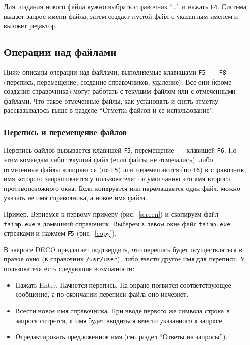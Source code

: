 Для создания нового файла нужно выбрать справочник ``{\tt .}''
и нажать {\tt F4}. Система выдаст запрос имени файла, затем создаст
пустой файл с указанным именем и вызовет редактор.

\subsection{Операции над файлами}

Ниже описаны операции над файлами, выполняемые клавишами {\tt F5}~---~{\tt F8}
(перепись, перемещение, создание справочников, удаление).
Все они (кроме создания справочника) могут работать с текущим
файлом или с отмеченными файлами. Что такое отмеченные
файлы, как установить и снять отметку рассказывалось выше в
разделе ``Отметка файлов и ее использование''.

\subsubsection{Перепись и перемещение файлов}

Перепись файлов вызывается клавишей {\tt F5}, перемещение~--- клавишей {\tt F6}.
По этим командам либо текущий файл (если файлы не отмечались),
либо отмеченные файлы копируются (по {\tt F5}) или перемещаются
(по {\tt F6}) в справочник, имя которого запрашивается у пользователя;
по умолчанию это имя второго, противоположного окна. Если копируется или
перемещается один файл, можно указать не имя справочника, а новое имя файла.

Пример. Вернемся к первому примеру (рис.~\ref{screen}) и скопируем
файл {\tt tsimp.exe} в домашний справочник. Выберем в левом окне файл
{\tt tsimp.exe} стрелками и нажмем {\tt F5} (рис.~\ref{copy}).


В запросе DECO предлагает подтвердить, что перепись
будет осуществляться в правое окно (в справочник {\tt /usr/user}), либо
ввести другое имя для переписи. У пользователя есть
следующие возможности:

\begin{itemize}
\item
Нажать Enter. Начнется перепись. На экране
появится соответствующее сообщение,
а по окончании переписи файла оно исчезнет.
\item
Всести новое имя справочника. При вводе первого же символа строка в
запросе сотрется, и имя будет вводиться вместо указанного в запросе.
\item
Отредактировать предложенное имя (см. раздел ``Ответы на запросы'').
\end{itemize}

